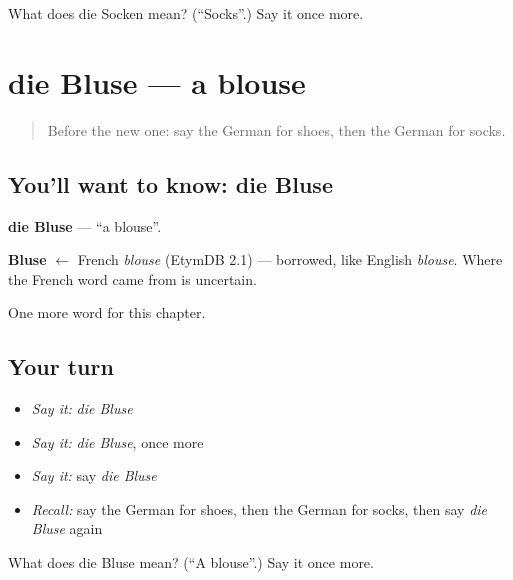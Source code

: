 \begin{tcolorbox}[breakable,colback=teal!4,colframe=teal!35!black,title={Before you move on}]
What does die Socken mean? (\textquotedblleft{}Socks\textquotedblright{}.) Say it once more.
\end{tcolorbox}
\section[die Bluse]{die Bluse — a blouse}

\label{lesson:GE-C120-bluse}



\begin{quote}
Before the new one: say the German for shoes, then the German for socks.
\end{quote}

\subsection*{You'll want to know: die Bluse}
\textbf{die Bluse} — \textquotedblleft{}a blouse\textquotedblright{}.

\begin{cousinweb}
\textbf{Bluse} $\leftarrow$ French \emph{blouse} (EtymDB 2.1) — borrowed, like English \emph{blouse}. Where the French word came from is uncertain.
\end{cousinweb}

\begin{grammarlens}[title={What you've built}]
One more word for this chapter.
\end{grammarlens}

\subsection*{Your turn}
\begin{itemize}
\raggedright
  \item \emph{Say it:} \emph{die Bluse}
  \item \emph{Say it:} \emph{die Bluse}, once more
  \item \emph{Say it:} say \emph{die Bluse}
  \item \emph{Recall:} say the German for shoes, then the German for socks, then say \emph{die Bluse} again
\end{itemize}

\begin{tcolorbox}[breakable,colback=teal!4,colframe=teal!35!black,title={Before you move on}]
What does die Bluse mean? (\textquotedblleft{}A blouse\textquotedblright{}.) Say it once more.
\end{tcolorbox}
